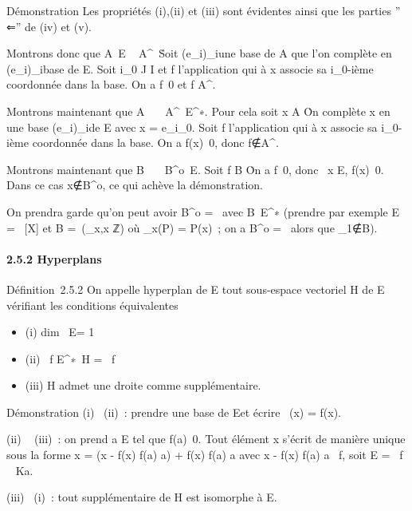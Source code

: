 \documentclass[]{article}
\begin{document}
Démonstration Les propriétés (i),(ii) et (iii) sont évidentes ainsi que
les parties '' ⇐'' de (iv) et (v).

Montrons donc que A\neq~E \rigtharrow~
A^\bot\neq~\0\.
Soit (e\_i)\_i\inI une base de A que l'on complète en
(e\_i)\_i\inJ base de E. Soit i\_0 \in J \diagdown I et f
l'application qui à x associe sa i\_0-ième coordonnée dans la
base. On a f\neq~0 et f \in A^\bot.

Montrons maintenant que
A\neq~\0\ \rigtharrow~
A^\bot\neq~E^∗. Pour cela soit
x \in A \diagdown\0\. On complète x en une base
(e\_i)\_i\inI de E avec x = e\_i\_0. Soit
f l'application qui à x associe sa i\_0-ième coordonnée dans la
base. On a f(x)\neq~0, donc
f∉A^\bot.

Montrons maintenant que
B\neq~\0\ \rigtharrow~
B^o\neq~E. Soit f \in B
\diagdown\0\. On a
f\neq~0, donc \exists~x \in E,
f(x)\neq~0. Dans ce cas
x∉B^o, ce qui achève la
démonstration.

On prendra garde qu'on peut avoir B^o =
\0\ avec
B\neq~E^∗ (prendre par exemple E =
~{[}X{]} et B =\
\mathrmVect(\epsilon\_x,x \in ℤ) où \epsilon\_x(P)
= P(x)~; on a B^o = \0\
alors que \epsilon\_1∉B).

\paragraph{2.5.2 Hyperplans}

Définition~2.5.2 On appelle hyperplan de E tout sous-espace vectoriel H
de E vérifiant les conditions équivalentes

\begin{itemize}
\itemsep1pt\parskip0pt
\item
  (i) dim~ E\diagupH = 1
\item
  (ii) \exists~f \in
  E^∗\diagdown\0\, H
  = \mathrmKer~f
\item
  (iii) H admet une droite comme supplémentaire.
\end{itemize}

Démonstration (i) \rigtharrow~(ii)~: prendre \overlinee une base
de E\diagupH et écrire \pi~(x) = f(x)\overlinee.

(ii) \rigtharrow~ (iii)~: on prend a \in E tel que f(a)\neq~0.
Tout élément x s'écrit de manière unique sous la forme x = (x - f(x)
\over f(a) a) + f(x) \over f(a) a
avec x - f(x) \over f(a) a
\in\mathrmKer~f, soit E
= \mathrmKer~f \oplus~ Ka.

(iii) \rigtharrow~(i)~: tout supplémentaire de H est isomorphe à E\diagupH.
\end{document}
